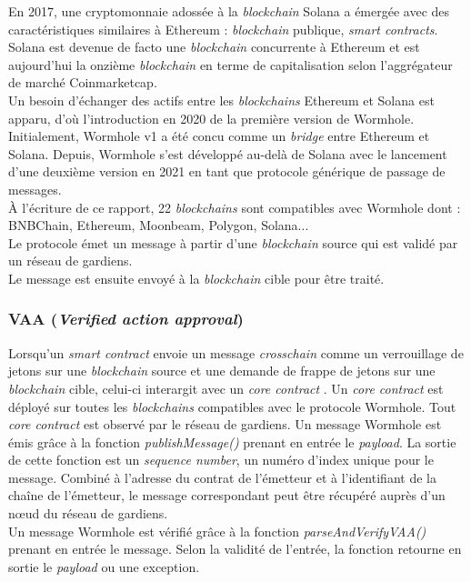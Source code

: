 En 2017, une cryptomonnaie adossée à la \textit{\gls{blockchain}} Solana a émergée avec des caractéristiques
similaires à \gls{Ethereum} : \textit{\gls{blockchain}} publique, \textit{\gls{smart contract}s}.\\
Solana est devenue de facto une \textit{\gls{blockchain}} concurrente à \gls{Ethereum} et est aujourd'hui 
la onzième \textit{\gls{blockchain}} en terme de capitalisation selon l'aggrégateur de marché Coinmarketcap.\\
Un besoin d'échanger des \gls{actif}s entre les \textit{\gls{blockchain}s} \gls{Ethereum} et Solana est apparu, 
d'où l'introduction en 2020 de la première version de \gls{Wormhole}.
Initialement, \gls{Wormhole} v1 a été concu comme un \textit{bridge} entre \gls{Ethereum} et Solana.
Depuis, \gls{Wormhole} s'est développé au-delà de Solana avec le lancement d'une deuxième version en 2021 
en tant que protocole générique de passage de messages.\\
À l'écriture de ce rapport, 22 \cite{wormholeNetwork} \textit{\gls{blockchain}s} sont compatibles avec \gls{Wormhole} 
dont : BNBChain, \gls{Ethereum}, Moonbeam, Polygon, Solana...\\
Le protocole émet un message à partir d'une \textit{\gls{blockchain}} source qui est validé par un réseau de 
gardiens.\\ 
Le message est ensuite envoyé à la \textit{\gls{blockchain}} cible pour être traité.

\subsubsection{VAA (\textit{Verified action approval})}

Lorsqu'un \textit{\gls{smart contract}} envoie un message \textit{crosschain} comme un verrouillage
de jetons sur une \textit{\gls{blockchain}} source et une demande de frappe de jetons sur une 
\textit{\gls{blockchain}} cible, celui-ci interargit avec un \textit{core contract} \cite{wormholeCoreContract}.
Un \textit{core contract} est déployé sur toutes les \textit{\gls{blockchain}s} compatibles avec le protocole 
\gls{Wormhole}. Tout \textit{core contract} est observé par le réseau de gardiens.
Un message \gls{Wormhole} est émis grâce à la fonction \textit{publishMessage()} prenant en entrée le \textit{payload}.
La sortie de cette fonction est un \textit{sequence number}, un numéro d'index unique pour le message.
Combiné à l'adresse du contrat de l'émetteur et à l'identifiant de la chaîne de l'émetteur, le message 
correspondant peut être récupéré auprès d'un nœud du réseau de gardiens.\\
Un message \gls{Wormhole} est vérifié grâce à la fonction \textit{parseAndVerifyVAA()} prenant en entrée le message.
Selon la validité de l'entrée, la fonction retourne en sortie le \textit{payload} ou une exception.

